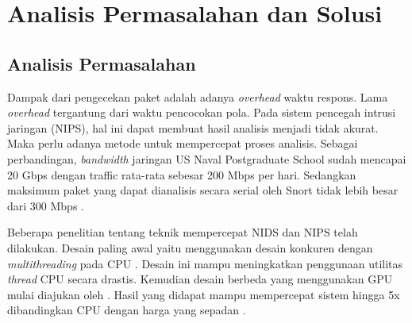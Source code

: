 
\chapter{Analisis Permasalahan dan Solusi}


  \section{Analisis Permasalahan}
  


    Dampak dari pengecekan paket adalah adanya \emph{overhead} waktu respons. Lama \emph{overhead} tergantung dari waktu pencocokan pola. Pada sistem pencegah intrusi jaringan (NIPS), hal ini dapat membuat hasil analisis menjadi tidak akurat. Maka perlu adanya metode untuk mempercepat proses analisis. Sebagai perbandingan, \emph{bandwidth} jaringan US Naval Postgraduate School sudah mencapai 20 Gbps dengan traffic rata-rata sebesar 200 Mbps per hari. Sedangkan maksimum paket yang dapat dianalisis secara serial oleh Snort tidak lebih besar dari 300 Mbps \citep{albin2012}.

    Beberapa penelitian tentang teknik mempercepat NIDS dan NIPS telah dilakukan. Desain paling awal yaitu menggunakan desain konkuren dengan \emph{multithreading} pada CPU \citep{multi2004}. Desain ini mampu meningkatkan penggunaan utilitas \emph{thread} CPU secara drastis. Kemudian desain berbeda yang menggunakan GPU mulai diajukan oleh \citep{gnort2008}. Hasil yang didapat mampu mempercepat sistem hingga 5x dibandingkan CPU dengan harga yang sepadan \citep{smith2009}.



